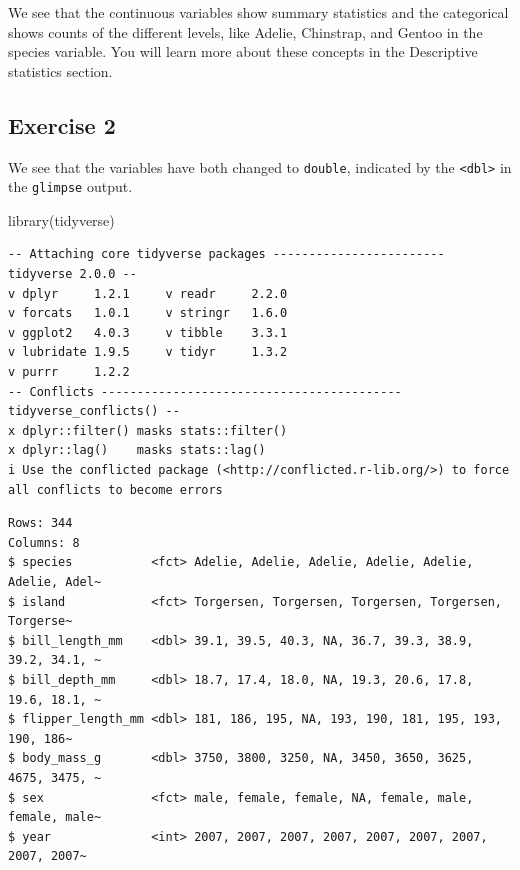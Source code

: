 \documentclass[
  letterpaper,
  DIV=11,
  numbers=noendperiod]{scrreprt}
\newenvironment{Shaded}{\begin{snugshade}}{\end{snugshade}}
\newcommand{\FunctionTok}[1]{\textcolor[rgb]{0.28,0.35,0.67}{#1}}
\newcommand{\NormalTok}[1]{\textcolor[rgb]{0.00,0.23,0.31}{#1}}
\newcommand{\OtherTok}[1]{\textcolor[rgb]{0.00,0.23,0.31}{#1}}
\newcommand{\SpecialCharTok}[1]{\textcolor[rgb]{0.37,0.37,0.37}{#1}}
\begin{document}
We see that the continuous variables show summary statistics and the
categorical shows counts of the different levels, like Adelie,
Chinstrap, and Gentoo in the species variable. You will learn more about
these concepts in the Descriptive statistics section.

\subsection{Exercise 2}\label{exercise-2-3}

We see that the variables have both changed to \texttt{double},
indicated by the \texttt{\textless{}dbl\textgreater{}} in the
\texttt{glimpse} output.

\begin{Shaded}
\begin{Highlighting}[]
\FunctionTok{library}\NormalTok{(tidyverse)}
\end{Highlighting}
\end{Shaded}

\begin{verbatim}
-- Attaching core tidyverse packages ------------------------ tidyverse 2.0.0 --
v dplyr     1.2.1     v readr     2.2.0
v forcats   1.0.1     v stringr   1.6.0
v ggplot2   4.0.3     v tibble    3.3.1
v lubridate 1.9.5     v tidyr     1.3.2
v purrr     1.2.2     
-- Conflicts ------------------------------------------ tidyverse_conflicts() --
x dplyr::filter() masks stats::filter()
x dplyr::lag()    masks stats::lag()
i Use the conflicted package (<http://conflicted.r-lib.org/>) to force all conflicts to become errors
\end{verbatim}

\begin{Shaded}
\end{Shaded}

\begin{verbatim}
Rows: 344
Columns: 8
$ species           <fct> Adelie, Adelie, Adelie, Adelie, Adelie, Adelie, Adel~
$ island            <fct> Torgersen, Torgersen, Torgersen, Torgersen, Torgerse~
$ bill_length_mm    <dbl> 39.1, 39.5, 40.3, NA, 36.7, 39.3, 38.9, 39.2, 34.1, ~
$ bill_depth_mm     <dbl> 18.7, 17.4, 18.0, NA, 19.3, 20.6, 17.8, 19.6, 18.1, ~
$ flipper_length_mm <dbl> 181, 186, 195, NA, 193, 190, 181, 195, 193, 190, 186~
$ body_mass_g       <dbl> 3750, 3800, 3250, NA, 3450, 3650, 3625, 4675, 3475, ~
$ sex               <fct> male, female, female, NA, female, male, female, male~
$ year              <int> 2007, 2007, 2007, 2007, 2007, 2007, 2007, 2007, 2007~
\end{verbatim}
\end{document}
